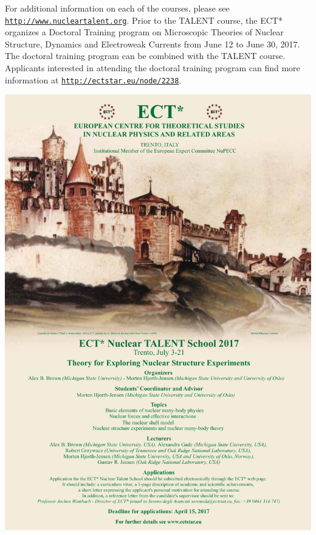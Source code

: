 \documentclass[%
oneside,                 %
final,                   %
10pt]{article}
\begin{document}
For additional information on each of the courses, please see
\href{{http://www.nucleartalent.org}}{\nolinkurl{http://www.nucleartalent.org}}. Prior to the TALENT course, the ECT* organizes 
a Doctoral Training program on Microscopic Theories of Nuclear Structure, Dynamics and 
Electroweak Currents from June 12 to June 30, 2017. 
The doctoral training program can be combined with the TALENT course.
Applicants interested in attending the doctoral training program can find more information at
\href{{http://ectstar.eu/node/2238}}{\nolinkurl{http://ectstar.eu/node/2238}}.





\vspace{6mm}

\centerline{\includegraphics[width=1.0\linewidth]{Poster.pdf}}

\vspace{6mm}




\end{document}
